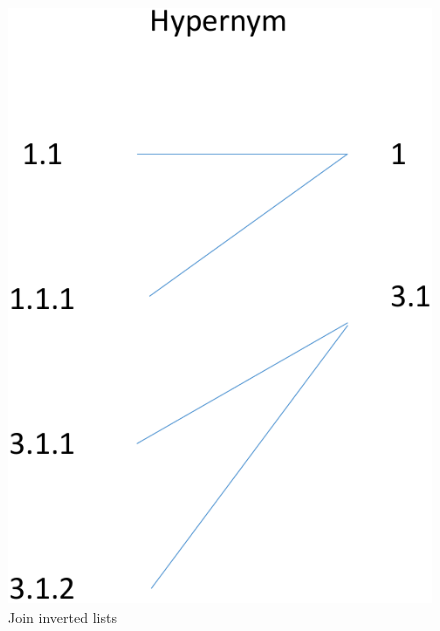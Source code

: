 \begin{figure}[t]
\centering
\includegraphics[scale=0.4]{figures/labeljoins}
 \caption{Join inverted lists}
\label{fig:invertedlist}
\end{figure}



